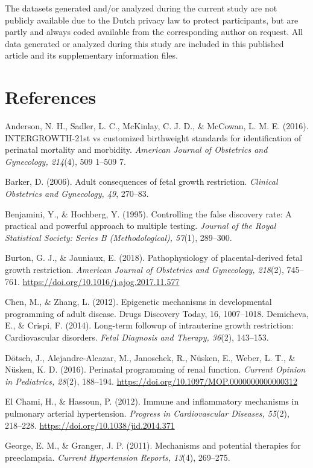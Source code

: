 \documentclass[authordate, empirical,issue]{jote-new-article}
\begin{document}
The datasets generated and/or analyzed during the current study are not publicly available due to the Dutch privacy law to protect participants, but are partly and always coded available from the corresponding author on request. All data generated or analyzed during this study are included in this published article and its supplementary information files.

\section{References}

Anderson, N. H., Sadler, L. C., McKinlay, C. J. D., \& McCowan, L. M. E. (2016). INTERGROWTH-21st vs customized birthweight standards for identification of perinatal mortality and morbidity. \emph{American Journal of Obstetrics and Gynecology, 214}(4), 509 1–509 7.

Barker, D. (2006). Adult consequences of fetal growth restriction. \emph{Clinical Obstetrics and Gynecology, 49}, 270–83.

Benjamini, Y., \& Hochberg, Y. (1995). Controlling the false discovery rate: A practical and powerful approach to multiple testing. \emph{Journal of the Royal Statistical Society: Series B (Methodological), 57}(1), 289–300.

Burton, G. J., \& Jauniaux, E. (2018). Pathophysiology of placental-derived fetal growth restriction. \emph{American Journal of Obstetrics and Gynecology, 218}(2), 745–761. \url{https://doi.org/10.1016/j.ajog.2017.11.577}

Chen, M., \& Zhang, L. (2012). Epigenetic mechanisms in developmental programming of adult disease. Drugs Discovery Today, 16, 1007–1018. Demicheva, E., \& Crispi, F. (2014). Long-term followup of intrauterine growth restriction: Cardiovascular disorders. \emph{Fetal Diagnosis and Therapy, 36}(2), 143–153.

Dötsch, J., Alejandre-Alcazar, M., Janoschek, R., Nüsken, E., Weber, L. T., \& Nüsken, K. D. (2016). Perinatal programming of renal function. \emph{Current Opinion in Pediatrics, 28}(2), 188–194. \url{https://doi.org/10.1097/MOP.0000000000000312}

El Chami, H., \& Hassoun, P. (2012). Immune and inflammatory mechanisms in pulmonary arterial hypertension. \emph{Progress in Cardiovascular Diseases, 55}(2), 218–228. \url{https://doi.org/10.1038/jid.2014.371}

George, E. M., \& Granger, J. P. (2011). Mechanisms and potential therapies for preeclampsia. \emph{Current Hypertension Reports, 13}(4), 269–275.
\end{document}

